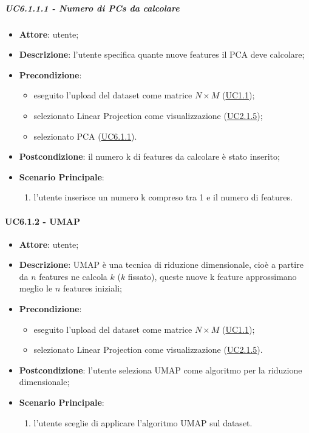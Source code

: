     \subparagraph{UC6.1.1.1 - Numero di PCs da calcolare}
    \label{uc6.1.1.1}
    \begin{itemize}
    \item \textbf{Attore}: utente;
    \item \textbf{Descrizione}: l'utente specifica quante nuove features il PCA deve calcolare;
    \item \textbf{Precondizione}: 
    \begin{itemize}
        \item eseguito l'upload del dataset come matrice $N\times M$ (\hyperref[uc1.1]{UC1.1});
        \item selezionato Linear Projection come visualizzazione (\hyperref[uc2.1.5]{UC2.1.5});
        \item selezionato PCA (\hyperref[uc6.1.1]{UC6.1.1}).
    \end{itemize}  
    \item \textbf{Postcondizione}: il numero k di features da calcolare è stato inserito;
    \item \textbf{Scenario Principale}: 
    \begin{enumerate}
        \item l'utente inserisce un numero k compreso tra 1 e il numero di features.
    \end{enumerate}  
    \end{itemize}
    
    
    \paragraph{UC6.1.2 - UMAP}
    \label{uc6.1.2}
    \begin{itemize}
    \item \textbf{Attore}: utente;
    \item \textbf{Descrizione}: UMAP è una tecnica di riduzione dimensionale, cioè a partire da $n$ features ne calcola $k$ ($k$ fissato), queste nuove k feature approssimano meglio le $n$ features iniziali;
    \item \textbf{Precondizione}: 
    \begin{itemize}
        \item eseguito l'upload del dataset come matrice $N\times M$ (\hyperref[uc1.1]{UC1.1});
        \item selezionato Linear Projection come visualizzazione (\hyperref[uc2.1.5]{UC2.1.5}).
    \end{itemize}  
    \item \textbf{Postcondizione}: l'utente seleziona UMAP come algoritmo per la riduzione dimensionale;
    \item \textbf{Scenario Principale}: 
    \begin{enumerate}
        \item l'utente sceglie di applicare l'algoritmo UMAP sul dataset.
    \end{enumerate}
    \end{itemize}
    
